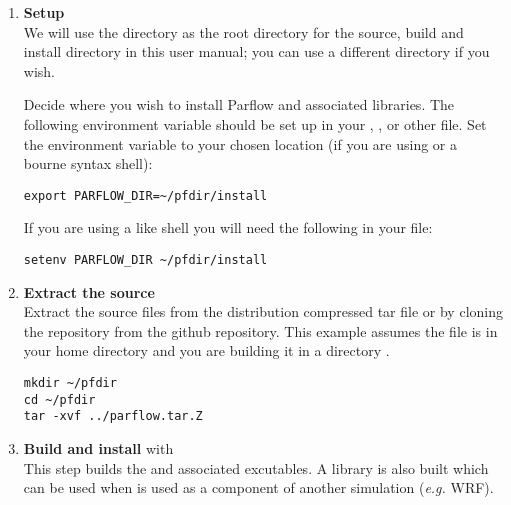 \begin{enumerate}
\item {\bf Setup} \\

We will use the  directory as the root directory for the
source, build and install directory in this user manual; you can use a
different directory if you wish.

Decide where you wish to install Parflow and
associated libraries. The following environment variable should be
set up in your , , or other file. Set
the environment variable  to your chosen location
(if you are using  or a bourne syntax shell):
\begin{display}\begin{verbatim}
export PARFLOW_DIR=~/pfdir/install
\end{verbatim}\end{display}
If you are using a  like shell you will need the following in your
 file:
\begin{display}\begin{verbatim}
setenv PARFLOW_DIR ~/pfdir/install
\end{verbatim}\end{display}


\item {\bf Extract the source}\\ Extract the source files from the
distribution compressed tar file or by cloning the repository from
the \parflow{} github repository.  This example assumes the
 file is in your home directory and you are
building it in a directory .

\begin{display}\begin{verbatim}
mkdir ~/pfdir
cd ~/pfdir
tar -xvf ../parflow.tar.Z
\end{verbatim}\end{display}


\item {\bf Build and install \parflow{}} with \cmake{}\\ This step builds
the \parflow{} and associated \pftools{} excutables.  A \parflow{}
library is also built which can be used when \parflow{} is used as a
component of another simulation (\emph{e.g.}  WRF).


\end{enumerate}
